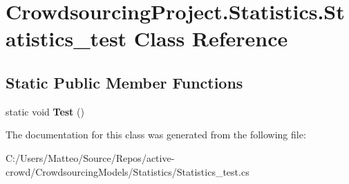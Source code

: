 \hypertarget{class_crowdsourcing_project_1_1_statistics_1_1_statistics__test}{}\section{Crowdsourcing\+Project.\+Statistics.\+Statistics\+\_\+test Class Reference}
\label{class_crowdsourcing_project_1_1_statistics_1_1_statistics__test}
\subsection*{Static Public Member Functions}
\begin{DoxyCompactItemize}
\item 
\hypertarget{class_crowdsourcing_project_1_1_statistics_1_1_statistics__test_a9e63f5a3dc0aba9d6d72ea4cf955093e}{}static void {\bfseries Test} ()\label{class_crowdsourcing_project_1_1_statistics_1_1_statistics__test_a9e63f5a3dc0aba9d6d72ea4cf955093e}

\end{DoxyCompactItemize}


The documentation for this class was generated from the following file\+:\begin{DoxyCompactItemize}
\item 
C\+:/\+Users/\+Matteo/\+Source/\+Repos/active-\/crowd/\+Crowdsourcing\+Models/\+Statistics/Statistics\+\_\+test.\+cs\end{DoxyCompactItemize}
